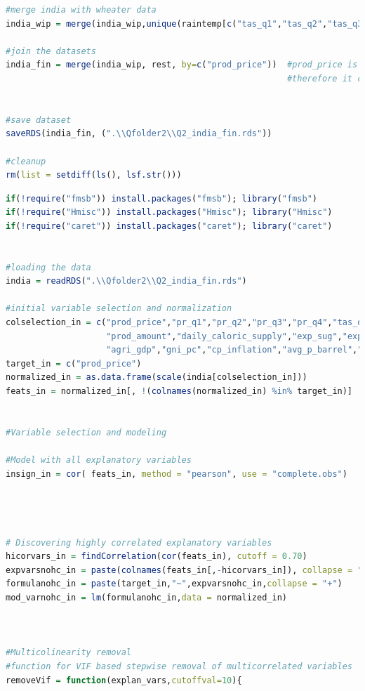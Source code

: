 \documentclass[11pt]{article}
\begin{document}
\begin{lstlisting}[language= R]
#merge india with wheater data
india_wip = merge(india_wip,unique(raintemp[c("tas_q1","tas_q2","tas_q3","tas_q4","pr_q1","pr_q2","pr_q3","pr_q4","year")]),by=c("year")) 

#join the datasets
india_fin = merge(india_wip, rest, by=c("prod_price"))  #prod_price is unique, 
                                                        #therefore it can be used as a key for the merge


#save dataset 
saveRDS(india_fin, (".\\Qfolder2\\Q2_india_fin.rds"))

#cleanup
rm(list = setdiff(ls(), lsf.str()))
\end{lstlisting}


\begin{lstlisting}[language= R]
if(!require("fmsb")) install.packages("fmsb"); library("fmsb")
if(!require("Hmisc")) install.packages("Hmisc"); library("Hmisc")
if(!require("caret")) install.packages("caret"); library("caret")


#loading the data
india = readRDS(".\\Qfolder2\\Q2_india_fin.rds")

#initial variable selection and normalization
colselection_in = c("prod_price","pr_q1","pr_q2","pr_q3","pr_q4","tas_q1","tas_q2","tas_q3","tas_q4",
                    "prod_amount","daily_caloric_supply","exp_sug","exp_veg","exp_cer","imp_sug","imp_veg","imp_cer", 
                    "agri_gdp","gni_pc","cp_inflation","avg_p_barrel","population") 
target_in = c("prod_price")
normalized_in = as.data.frame(scale(india[colselection_in]))
feats_in = normalized_in[, !(colnames(normalized_in) %in% target_in)]


#Variable selection and modeling

#Model with all explanatory variables 
insign_in = cor( feats_in, method = "pearson", use = "complete.obs")




# Discovering highly correlated explanatory variables
hicorvars_in = findCorrelation(cor(feats_in), cutoff = 0.70)
expvarsnohc_in = paste(colnames(feats_in[,-hicorvars_in]), collapse = "+")
formulanohc_in = paste(target_in,"~",expvarsnohc_in,collapse = "+")
mod_varnohc_in = lm(formulanohc_in,data = normalized_in)



#Multicolinearity removal 
#function for VIF based stepwise removal of multicorrelated variables
removeVif = function(explan_vars,cutoffval=10){
  

\end{lstlisting}
\end{document}
